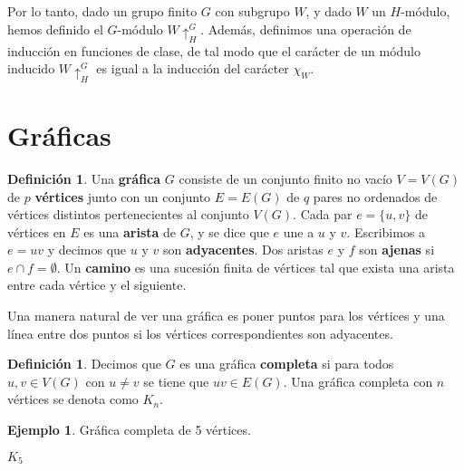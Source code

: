 \documentclass[12pt]{book}
\theoremstyle{definition}
\newtheorem{definition}[theorem]{Definición}
\newtheorem{example}[theorem]{Ejemplo}
\newcounter{in}
\newcounter{ini}
\begin{document}
Por lo tanto, dado un grupo finito $G$ con subgrupo $W$, y dado $W$ un
$H$-módulo, hemos definido el $G$-módulo $W\uparrow^{G}_{H}$. Además,
definimos una operación de inducción en funciones de clase, de tal
modo que el carácter de un módulo inducido $W\uparrow^{G}_{H}$ es
igual a la inducción del carácter $\chi_{W}$.

\section{Gráficas}
\label{graficas}

\begin{definition}
  Una \textbf{gráfica} $G$ consiste de un conjunto finito no vacío $V=V(G)$
  de $p$ \textbf{vértices} junto con un conjunto $E=E(G)$ de $q$ pares no
  ordenados de vértices distintos pertenecientes al conjunto $V(G)$. Cada par $e=\{u,v\}$ de vértices
  en $E$ es una \textbf{arista} de $G$, y se dice que $e$ une a $u$ y
  $v$. Escribimos a $e=uv$ y decimos que $u$ y $v$ son \textbf{adyacentes}.
  Dos aristas $e$ y $f$ son \textbf{ajenas} si $e\cap f=\emptyset$. Un
  \textbf{camino} es una sucesión finita de
  vértices tal que exista una arista entre cada vértice y el siguiente.
\end{definition}

Una manera natural de ver una gráfica es poner puntos para los
vértices y una línea entre dos puntos si los vértices correspondientes
son adyacentes.
\begin{definition}
  Decimos que $G$ es una gráfica \textbf{completa} si para
  todos~$u,v\in V(G)$ con $u\neq v$ se tiene que $uv\in E(G)$. Una gráfica completa con
  $n$ vértices se denota como $K_{n}$.
\end{definition}
\begin{example}
  Gráfica completa de 5 vértices.
  \bigskip

  \begin{minipage}{1.0\linewidth}
    \centering
  
    $K_{5}$
  \end{minipage}
  \label{fig:K5}
\end{example}
\end{document}
